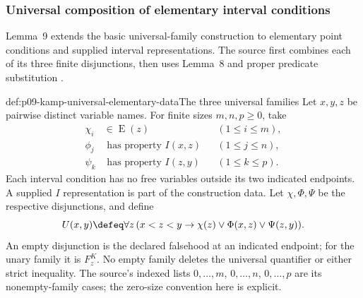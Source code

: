 
\subsubsection{Universal composition of elementary interval conditions}
\label{sec:p09-kamp-iii2-lemma9}

Lemma~9 extends the basic universal-family construction to elementary
point conditions and supplied interval representations. The source first
combines each of its three finite disjunctions, then uses Lemma~8 and
proper predicate substitution
\cite[ch.~III, lemma~9, pp.~92--93]{Kamp1968}.

\begin{hbdefinition}{def:p09-kamp-universal-elementary-data}{The three universal families}
Let \(x,y,z\) be pairwise distinct variable names. For finite sizes
\(m,n,p\geq0\), take
\[
\begin{aligned}
 \chi_i&\in\operatorname{E}(z) &&(1\leq i\leq m),\\
 \phi_j&\text{ has property }I(x,z) &&(1\leq j\leq n),\\
 \psi_k&\text{ has property }I(z,y) &&(1\leq k\leq p).
\end{aligned}
\]
Each interval condition has no free variables outside its two indicated
endpoints. A supplied \(I\) representation is part of the construction
data. Let \(\chi,\Phi,\Psi\) be the respective disjunctions,
and define
\[
 U(x,y)\defeq\forall z\,(x<z<y\to\chi(z)\lor\Phi(x,z)\lor\Psi(z,y)).
\]
An empty disjunction is the declared falsehood at an indicated endpoint;
for the unary family it is \(F^K_z\). No empty family deletes the
universal quantifier or either strict inequality. The source's indexed
lists \(0,\ldots,m\), \(0,\ldots,n\), \(0,\ldots,p\)
are its nonempty-family cases; the zero-size convention here is explicit.
\end{hbdefinition}

